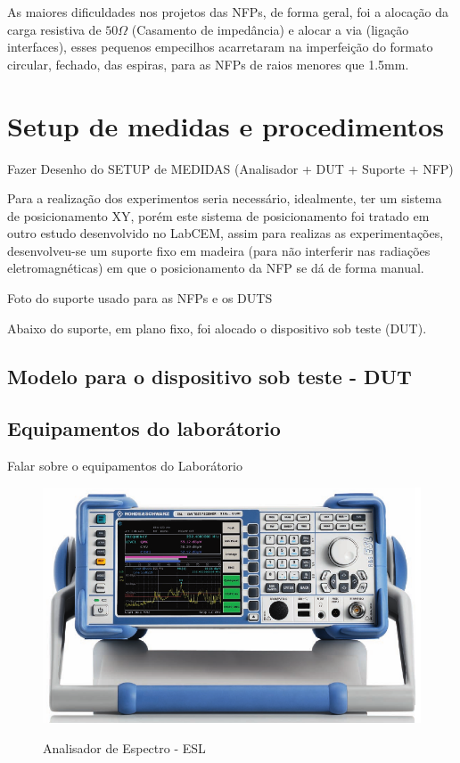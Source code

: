 As maiores dificuldades nos projetos das NFPs, de forma geral, foi a alocação da carga resistiva de $50\Omega$ (Casamento de impedância) e alocar a via (ligação interfaces), esses pequenos empecilhos acarretaram na imperfeição do formato circular, fechado, das espiras, para as NFPs de raios menores que 1.5mm.

\section{Setup de medidas e procedimentos}

Fazer Desenho do SETUP de MEDIDAS (Analisador + DUT + Suporte + NFP)


Para a realização dos experimentos seria necessário, idealmente, ter um sistema de posicionamento XY, porém este sistema de posicionamento foi tratado em outro estudo desenvolvido no LabCEM, assim para realizas as experimentações, desenvolveu-se um suporte fixo em madeira (para não interferir nas radiações eletromagnéticas) em que o posicionamento da NFP se dá de forma manual.

Foto do suporte usado para as NFPs e os DUTS

Abaixo do suporte, em plano fixo, foi alocado o dispositivo sob teste (DUT).

\subsection{Modelo para o dispositivo sob teste - DUT}


\subsection{Equipamentos do laborátorio}
Falar sobre o equipamentos do Laborátorio

\begin{figure}[htb!]
	\centering 
	\caption{Analisador de Espectro - ESL}
	\includegraphics[scale=0.6]{./img/esl}
	\label{fig:esl}
\end{figure}

